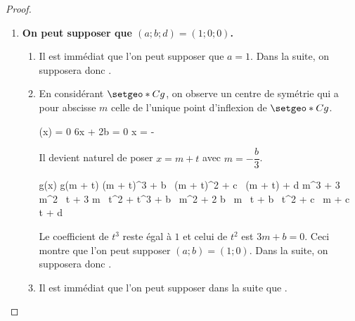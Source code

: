 \begin{proof}
	\leavevmode
	\begin{enumerate}
		\item \textbf{On peut supposer que $(a ; b ; d) = (1 ; 0 ; 0)$.}

		      \begin{enumerate}
		      		\item Il est immédiat que l'on peut supposer que $a = 1$. 
				          Dans la suite, on supposera donc .

		      		\item En considérant $\setgeo*{C}{g}$, on observe un centre de symétrie qui a pour abscisse $m$ celle de l'unique point d'inflexion de $\setgeo*{C}{g}$.
					      
					      \smallskip
					      
					      \noindent
					      \begin{stepcalc}[style = sar, ope = \iff]
					      		(x) = 0
									\explnext{}
								6x + 2b = 0
									\explnext{}
								x = - 
					      \end{stepcalc}
					      
					      \smallskip
					      
					      \noindent
					      Il devient naturel de poser $x = m + t$ avec $m = - \dfrac{b}{3}$.
					      
					      \smallskip
					      
					      \noindent
					      \begin{stepcalc}[style = sar]
					      		g(x)
									\explnext{}
								g(m + t)
									\explnext{}
								(m + t)^3 + b \, (m + t)^2 + c \, (m + t) + d
									\explnext{}
								m^3 + 3 m^2 \, t + 3 m \, t^2 + t^3
									+ b \, m^2 + 2 b \, m \, t + b \, t^2 
									+ c \, m + c \, t + d
					      \end{stepcalc} 
					      
					      \smallskip
					      
					      \noindent
					      Le coefficient de $t^3$ reste égal à $1$ et celui de $t^2$ est $3m + b = 0$. Ceci montre que l'on peut supposer $(a ; b) = (1 ; 0)$.
				          Dans la suite, on supposera donc .

		      		\item Il est immédiat que l'on peut supposer dans la suite que .
		      \end{enumerate}



\end{enumerate}
\end{proof}
